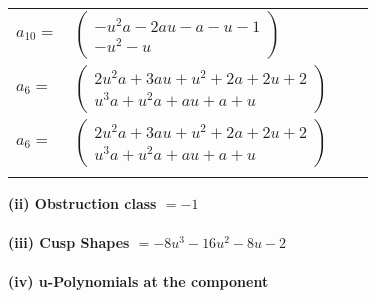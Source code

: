 \documentclass[1p]{elsarticle_modified}
\theoremstyle{definition}
\begin{document}
\begin{tabular}{m{7pt} m{180pt} m{7pt} m{180pt} }
\flushright $a_{10}=$&$\begin{pmatrix}- u^2 a-2 a u- a- u-1\\- u^2- u\end{pmatrix}$ \\
\flushright $a_{6}=$&$\begin{pmatrix}2 u^2 a+3 a u+u^2+2 a+2 u+2\\u^3 a+u^2 a+a u+a+u\end{pmatrix}$\\ \flushright $a_{6}=$&$\begin{pmatrix}2 u^2 a+3 a u+u^2+2 a+2 u+2\\u^3 a+u^2 a+a u+a+u\end{pmatrix}$\\&\end{tabular}
\flushleft \textbf{(ii) Obstruction class $= -1$}\\~\\
\flushleft \textbf{(iii) Cusp Shapes $= -8 u^3-16 u^2-8 u-2$}\\~\\
\newpage\renewcommand{\arraystretch}{1}
\flushleft \textbf{(iv) u-Polynomials at the component}\newline \\
\end{document}
